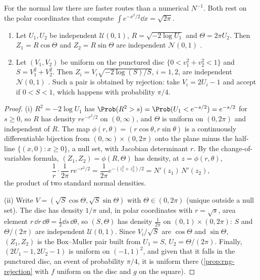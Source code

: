 For the normal law there are faster routes than a numerical $N^{-1}$. Both rest on the
polar coordinates that compute $\int e^{-x^2/2}\dd x=\sqrt{2\pi}$.

\begin{proposition}\label{prop:rng-box-muller}
\begin{enumerate}[label=(\roman*)]
  \item Let $U_1,U_2$ be independent $\mathcal U(0,1)$, $R=\sqrt{-2\log U_1}$ and
    $\Theta=2\pi U_2$. Then $Z_1=R\cos\Theta$ and $Z_2=R\sin\Theta$ are independent
    $\mathcal N(0,1)$ \citep{box-muller}.
  \item Let $(V_1,V_2)$ be uniform on the punctured disc $\{0<v_1^2+v_2^2<1\}$ and
    $S=V_1^2+V_2^2$. Then $Z_i=V_i\sqrt{-2\log(S)/S}$, $i=1,2$, are independent
    $\mathcal N(0,1)$ \citep{marsaglia-bray}. Such a pair is obtained by rejection: take
    $V_i=2U_i-1$ and accept if $0<S<1$, which happens with probability $\pi/4$.
\end{enumerate}
\end{proposition}

\begin{proof}
(i) $R^2=-2\log U_1$ has $\Prob(R^2>s)=\Prob(U_1<e^{-s/2})=e^{-s/2}$ for $s\ge0$, so $R$ has
density $re^{-r^2/2}$ on $(0,\infty)$, and $\Theta$ is uniform on $(0,2\pi)$ and independent
of $R$. The map $\phi(r,\theta)=(r\cos\theta,r\sin\theta)$ is a continuously differentiable
bijection from $(0,\infty)\times(0,2\pi)$ onto the plane minus the half-line
$\{(x,0):x\ge0\}$, a null set, with Jacobian determinant $r$. By the change-of-variables
formula, $(Z_1,Z_2)=\phi(R,\Theta)$ has density, at $z=\phi(r,\theta)$,
\[
  \frac{1}{r}\cdot\frac{1}{2\pi}\,re^{-r^2/2}=\frac{1}{2\pi}e^{-(z_1^2+z_2^2)/2}
  =N'(z_1)\,N'(z_2),
\]
the product of two standard normal densities.

(ii) Write $V=(\sqrt S\cos\Theta,\sqrt S\sin\Theta)$ with $\Theta\in(0,2\pi)$ (unique outside
a null set). The disc has density $1/\pi$ and, in polar coordinates with $r=\sqrt s$, area
element $r\,\dd r\,\dd\theta=\frac12\dd s\,\dd\theta$, so $(S,\Theta)$ has density $\frac1{2\pi}$
on $(0,1)\times(0,2\pi)$: $S$ and $\Theta/(2\pi)$ are independent $\mathcal U(0,1)$. Since
$V_i/\sqrt S$ are $\cos\Theta$ and $\sin\Theta$, $(Z_1,Z_2)$ is the Box--Muller pair built from
$U_1=S$, $U_2=\Theta/(2\pi)$. Finally, $(2U_1-1,2U_2-1)$ is uniform on $(-1,1)^2$, and given
that it falls in the punctured disc, an event of probability $\pi/4$, it is uniform there
(\cref{prop:rng-rejection} with $f$ uniform on the disc and $g$ on the square).
\end{proof}

